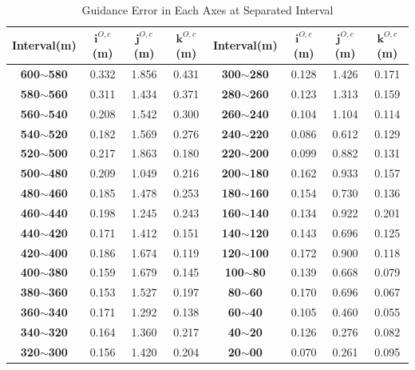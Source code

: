 \begin{table}[!th]
	\centering
	\caption{Guidance Error in Each Axes at Separated Interval}
	\label{lab:ground_landing}
	\begin{tabular}{cccc|cccc}
		\hline
		\textbf{Interval(m)} & \textbf{$\mathbf{i}^{O,c}$(m)} & \textbf{$\mathbf{j}^{O,c}$(m)} & \textbf{$\mathbf{k}^{O,c}$(m)} & \textbf{Interval(m)} & \textbf{$\mathbf{i}^{O,c}$(m)} & \textbf{$\mathbf{j}^{O,c}$(m)} & \textbf{$\mathbf{k}^{O,c}$(m)} \\ \hline
		\textbf{600$\sim$580} & 0.332 & 1.856 & 0.431 & \textbf{300$\sim$280} & 0.128 & 1.426 & 0.171 \\
		\textbf{580$\sim$560} & 0.311 & 1.434 & 0.371 & \textbf{280$\sim$260} & 0.123 & 1.313 & 0.159 \\
		\textbf{560$\sim$540} & 0.208 & 1.542 & 0.300 & \textbf{260$\sim$240} & 0.104 & 1.104 & 0.114 \\
		\textbf{540$\sim$520} & 0.182 & 1.569 & 0.276 & \textbf{240$\sim$220} & 0.086 & 0.612 & 0.129 \\
		\textbf{520$\sim$500} & 0.217 & 1.863 & 0.180 & \textbf{220$\sim$200} & 0.099 & 0.882 & 0.131 \\
		\textbf{500$\sim$480} & 0.209 & 1.049 & 0.216 & \textbf{200$\sim$180} & 0.162 & 0.933 & 0.157 \\
		\textbf{480$\sim$460} & 0.185 & 1.478 & 0.253 & \textbf{180$\sim$160} & 0.154 & 0.730 & 0.136 \\
		\textbf{460$\sim$440} & 0.198 & 1.245 & 0.243 & \textbf{160$\sim$140} & 0.134 & 0.922 & 0.201 \\
		\textbf{440$\sim$420} & 0.171 & 1.412 & 0.151 & \textbf{140$\sim$120} & 0.143 & 0.696 & 0.125 \\
		\textbf{420$\sim$400} & 0.186 & 1.674 & 0.119 & \textbf{120$\sim$100} & 0.172 & 0.900 & 0.118 \\
		\textbf{400$\sim$380} & 0.159 & 1.679 & 0.145 & \textbf{100$\sim$80} & 0.139 & 0.668 & 0.079 \\
		\textbf{380$\sim$360} & 0.153 & 1.527 & 0.197 & \textbf{80$\sim$60} & 0.170 & 0.696 & 0.067 \\
		\textbf{360$\sim$340} & 0.171 & 1.292 & 0.138 & \textbf{60$\sim$40} & 0.105 & 0.460 & 0.055 \\
		\textbf{340$\sim$320} & 0.164 & 1.360 & 0.217 & \textbf{40$\sim$20} & 0.126 & 0.276 & 0.082 \\
		\textbf{320$\sim$300} & 0.156 & 1.420 & 0.204 & \textbf{20$\sim$00} & 0.070 & 0.261 & 0.095 \\ \hline
	\end{tabular}
\end{table}



